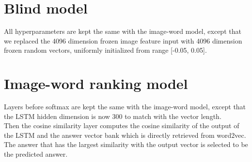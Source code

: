 \section{Blind model}
All hyperparameters are kept the same with the image-word model, except that we replaced the 4096 dimension frozen image feature input with 4096 dimension frozen random vectors, uniformly initialized from range [-0.05, 0.05].

\section{Image-word ranking model}
Layers before softmax are kept the same with the image-word model, except that the LSTM hidden dimension is now 300 to match with the vector length.\\
Then the cosine similarity layer computes the cosine similarity of the output of the LSTM and the answer vector bank which is directly retrieved from word2vec.\\
The answer that has the largest similarity with the output vector is selected to be the predicted answer.

